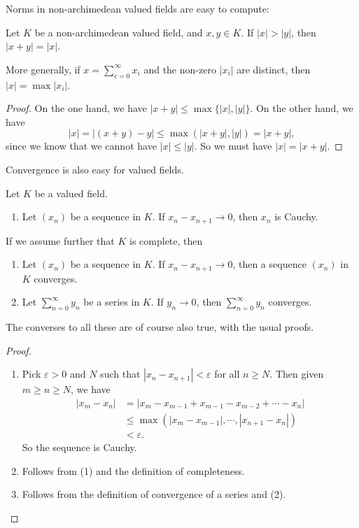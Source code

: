 \documentclass[a4paper]{article}
\begin{document}
Norms in non-archimedean valued fields are easy to compute:
\begin{prop}
  Let $K$ be a non-archimedean valued field, and $x, y \in K$. If $|x| > |y|$, then $|x + y| = |x|$.

  More generally, if $x = \sum_{c = 0}^\infty x_i$ and the non-zero $|x_i|$ are distinct, then $|x| = \max |x_i|$.
\end{prop}

\begin{proof}
  On the one hand, we have $|x + y| \leq \max\{|x|, |y|\}$. On the other hand, we have
  \[
    |x| = |(x + y) - y| \leq \max(|x + y|, |y|) = |x + y|,
  \]
  since we know that we cannot have $|x| \leq |y|$. So we must have $|x| = |x + y|$.
\end{proof}

Convergence is also easy for valued fields.
\begin{prop}
  Let $K$ be a valued field.
  \begin{enumerate}
    \item Let $(x_n)$ be a sequence in $K$. If $x_n - x_{n + 1} \to 0$, then $x_n$ is Cauchy.
  \end{enumerate}
  If we assume further that $K$ is complete, then
  \begin{enumerate}[resume]
    \item Let $(x_n)$ be a sequence in $K$. If $x_n - x_{n + 1} \to 0$, then a sequence $(x_n)$ in $K$ converges.
    \item Let $\sum_{n = 0}^\infty y_n$ be a series in $K$. If $y_n \to 0$, then $\sum_{n = 0}^\infty y_n$ converges.
  \end{enumerate}
\end{prop}
The converses to all these are of course also true, with the usual proofs.

\begin{proof}\leavevmode
  \begin{enumerate}
    \item Pick $\varepsilon > 0$ and $N$ such that $|x_n - x_{n + 1}| < \varepsilon$ for all $n \geq N$. Then given $m\geq n \geq N$, we have
      \begin{align*}
        |x_m - x_n| &= |x_m - x_{m - 1} + x_{m - 1} - x_{m - 2} + \cdots - x_n| \\
        &\leq \max(|x_m - x_{m - 1}|, \cdots, |x_{n + 1} - x_n|) \\
        &< \varepsilon.
      \end{align*}
      So the sequence is Cauchy.
    \item Follows from (1) and the definition of completeness.
    \item Follows from the definition of convergence of a series and (2).
  \end{enumerate}
\end{proof}
\end{document}
